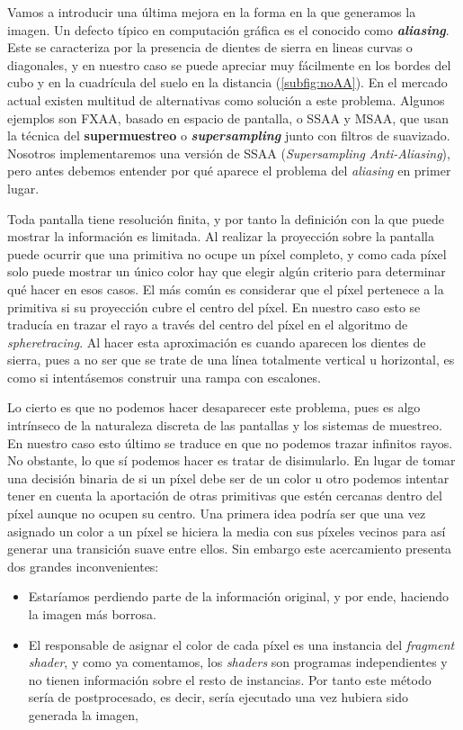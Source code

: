 Vamos a introducir una última mejora en la forma en la que generamos la imagen. Un defecto típico en computación gráfica es el conocido como \textbf{\textit{aliasing}}. Este se caracteriza por la presencia de dientes de sierra en lineas curvas o diagonales, y en nuestro caso se puede apreciar muy fácilmente en los bordes del cubo y en la cuadrícula del suelo en la distancia (\autoref{subfig:noAA}). En el mercado actual existen multitud de alternativas como solución a este problema. Algunos ejemplos son FXAA, basado en espacio de pantalla, o SSAA y MSAA, que usan la técnica del \textbf{supermuestreo} o \textbf{\textit{supersampling}} junto con filtros de suavizado. Nosotros implementaremos una versión de SSAA (\textit{Supersampling Anti-Aliasing}), pero antes debemos entender por qué aparece el problema del \textit{aliasing} en primer lugar. \newline

Toda pantalla tiene resolución finita, y por tanto la definición con la que puede mostrar la información es limitada. Al realizar la proyección sobre la pantalla puede ocurrir que una primitiva no ocupe un píxel completo, y como cada píxel solo puede mostrar un único color hay que elegir algún criterio para determinar qué hacer en esos casos. El más común es considerar que el píxel pertenece a la primitiva si su proyección cubre el centro del píxel. En nuestro caso esto se traducía en trazar el rayo a través del centro del píxel en el algoritmo de \textit{spheretracing}. Al hacer esta aproximación es cuando aparecen los dientes de sierra, pues a no ser que se trate de una línea totalmente vertical u horizontal, es como si intentásemos construir una rampa con escalones.\newline

Lo cierto es que no podemos hacer desaparecer este problema, pues es algo intrínseco de la naturaleza discreta de las pantallas y los sistemas de muestreo. En nuestro caso esto último se traduce en que no podemos trazar infinitos rayos. No obstante, lo que sí podemos hacer es tratar de disimularlo. En lugar de tomar una decisión binaria de si un píxel debe ser de un color u otro podemos intentar tener en cuenta la aportación de otras primitivas que estén cercanas dentro del píxel aunque no ocupen su centro. Una primera idea podría ser que una vez asignado un color a un píxel se hiciera la media con sus píxeles vecinos para así generar una transición suave entre ellos. Sin embargo este acercamiento presenta dos grandes inconvenientes:
\begin{itemize}
    \item Estaríamos perdiendo parte de la información original, y por ende, haciendo la imagen más borrosa.
    \item El responsable de asignar el color de cada píxel es una instancia del \textit{fragment shader}, y como ya comentamos, los \textit{shaders} son programas independientes y no tienen información sobre el resto de instancias. Por tanto este método sería de postprocesado, es decir, sería ejecutado una vez hubiera sido generada la imagen,
    
\end{itemize}

